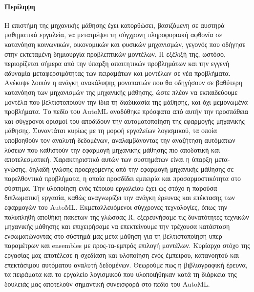 {
	\titleformat{\paragraph}[display]{\normalfont\Large\bfseries\centering}{\theparagraph}{1em}{}
	\paragraph{Περίληψη}
	Η επιστήμη της μηχανικής μάθησης έχει κατορθώσει, βασιζόμενη σε αυστηρά μαθηματικά εργαλεία, να μετατρέψει τη σύγχρονη πληροφοριακή αφθονία σε κατανόηση κοινωνικών, οικονομικών και φυσικών μηχανισμών, γεγονός που οδήγησε στην εκτεταμένη δημιουργία προβλεπτικών μοντέλων. Η εξέλιξή της, ωστόσο, περιορίζεται σήμερα από την ύπαρξη απαιτητικών προβλημάτων και την εγγενή αδυναμία μεταφερσιμότητας των πειραμάτων και μοντέλων σε νέα προβλήματα. Ανέκυψε λοιπόν η ανάγκη ανακάλυψης μονοπατιών που θα οδηγήσουν σε βαθύτερη κατανόηση των μηχανισμών της μηχανικής μάθησης, ώστε πλέον να εκπαιδεύουμε μοντέλα που βελτιστοποιούν την ίδια τη διαδικασία της μάθησης, και όχι μεμονωμένα προβλήματα. Το πεδίο του ΑutoML αναδύθηκε πρόσφατα από αυτήν την προσπάθεια και σύγχρονοι ορισμοί του αποδίδουν την αυτοματοποίηση της εφαρμογής μηχανικής μάθησης. Συναντάται κυρίως με τη μορφή εργαλείων λογισμικού, τα οποία υποβοηθούν τον αναλυτή δεδομένων, αναλαμβάνοντας την αναζήτηση αυτόματων λύσεων που καθιστούν την εφαρμογή μηχανικής μάθησης πιο αποδοτική και αποτελεσματική. Χαρακτηριστικό αυτών των συστημάτων είναι η ύπαρξη μετα-γνώσης, δηλαδή γνώσης προερχόμενης από την εφαρμογή μηχανικής μάθησης σε παρελθοντικά προβλήματα, η οποία προσδίδει εμπειρία και προσαρμοστικότητα στο σύστημα. Την υλοποίηση ενός τέτοιου εργαλείου έχει ως στόχο η παρούσα διπλωματική εργασία, καθώς αναγνωρίζει την ανάγκη έρευνας και επέκτασης των εφαρμογών του \gls{AutoML}. Εκμεταλλευόμενοι σύγχρονες τεχνολογίες, όπως την πολυπληθή αποθήκη πακέτων της γλώσσας R, εξερευνήσαμε τις δυνατότητες τεχνικών μηχανικής μάθησης και επιχειρήσαμε να επεκτείνουμε την τρέχουσα κατάσταση ενσωματώνοντας στο σύστημά μας μετα-μάθηση για τη βελτιστοποίηση υπερ-παραμέτρων και ensembles με προς-τα-εμπρός επιλογή μοντέλων. Κυρίαρχο στόχο της εργασίας μας αποτέλεσε η σχεδίαση και υλοποίηση ενός έμπειρου, κατανοητού και επεκτάσιμου αυτόματου αναλυτή δεδομένων. Θεωρούμε πως η βιβλιογραφική έρευνα, τα πειράματα και το εργαλείο λογισμικού που υλοποιήθηκαν κατά τη διάρκεια της δουλειάς μας αποτελούν σημαντική συνεισφορά στο πεδίο του \gls{AutoML}. 
	\newpage
}

